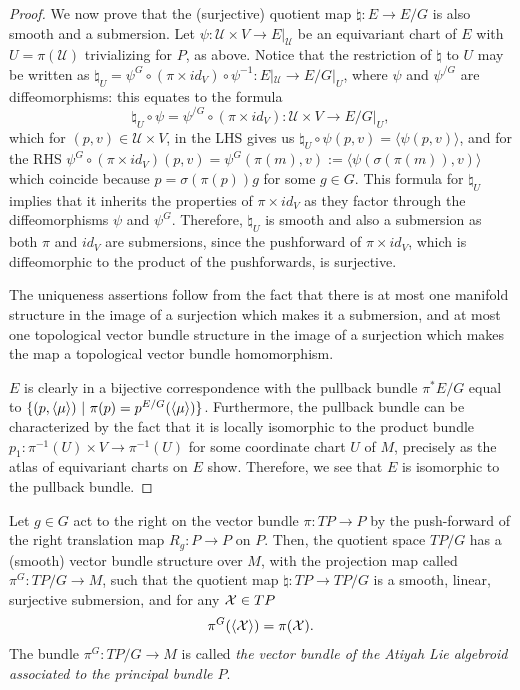 \begin{proof}
We now prove that the (surjective) quotient map $\natural : E \to E/G$ is also smooth and a submersion. Let $\psi: \mathcal U \times V \to E|_{\mathcal U}$ be an equivariant chart of $E$ with $U = \pi(\mathcal U)$ trivializing for $P$, as above. Notice that the restriction of $\natural$ to $U$ may be written as $\natural_U = \psi^{G} \circ (\pi \times id_V) \circ \psi^{-1}: E|_{\mathcal U} \to E/G|_U$, where $\psi$ and $\psi^{/G}$ are diffeomorphisms: this equates to the formula \[\natural_U \circ \psi = \psi^{/G} \circ (\pi \times id_V): \mathcal U \times V \to E/G|_U,\] which for $(p, v) \in \mathcal U \times V$, in the LHS gives us $\natural_U \circ \psi(p, v) = \langle\psi(p, v)\rangle$, and for the RHS $\psi^{G} \circ (\pi \times id_V) (p, v) = \psi^{G}(\pi(m), v) := \langle\psi(\sigma(\pi(m)), v)\rangle$ which coincide because $p = \sigma(\pi(p))g$ for some $g \in G$. This formula for $\natural_U$ implies that it inherits the properties of $\pi \times id_V$ as they factor through the diffeomorphisms $\psi$ and $\psi^G$. Therefore, $\natural_U$ is smooth and also a submersion as both $\pi$ and $id_V$ are submersions, since the pushforward of $\pi \times id_V$, which is diffeomorphic to the product of the pushforwards, is surjective.

The uniqueness assertions follow from the fact that there is at most one manifold structure in the image of a surjection which makes it a submersion, and at most one topological vector bundle structure in the image of a surjection which makes the map a topological vector bundle homomorphism.

$E$ is clearly in a bijective correspondence with the pullback bundle $\pi^*E/G$ equal to $\{(p, \left\langle \mu \right\rangle) \ |\  \pi(p) = p^{E/G}(\left\langle \mu \right\rangle)\}$. Furthermore, the pullback bundle can be characterized by the fact that it is locally isomorphic to the product bundle $p_1: \pi^{-1}(U) \times V \to \pi^{-1}(U)$ for some coordinate chart $U$ of $M$, precisely as the atlas of equivariant charts on $E$ show. Therefore, we see that $E$ is isomorphic to the pullback bundle.
\end{proof}

\begin{theorem}\label{theoTPGexists}
Let $g \in G$ act to the right on the vector bundle $\pi:TP \to P$ by the push-forward of the right translation map $R_g: P \to P$ on $P$. Then, the quotient space $TP/G$ has a (smooth) vector bundle structure over $M$, with the projection map called $\pi^G: TP/G \to M$, such that the quotient map $\natural: TP \to TP/G$ is a smooth, linear, surjective submersion, and for any $\mathcal{X} \in TP$
\begin{align}\label{eqnProjectionAtiyah}
\pi^G(\left\langle \mathcal{X} \right\rangle) = \pi(\mathcal{X}).    
\end{align}
The bundle $\pi^G:TP/G \to M$ is called \emph{the vector bundle of the Atiyah Lie algebroid associated to the principal bundle $P$}.
\end{theorem}

